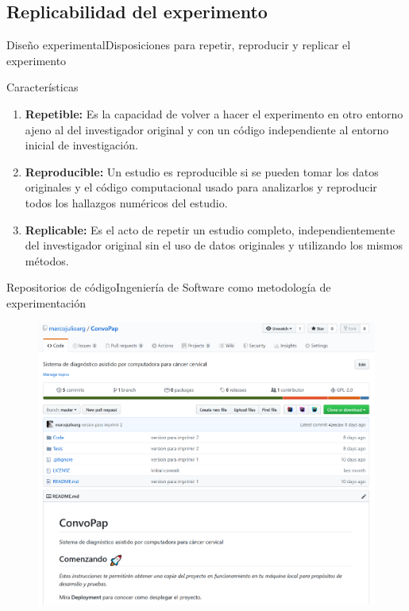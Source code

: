 \documentclass{beamer}
\begin{document}
    \subsection{Replicabilidad del experimento}
    \begin{frame}{Diseño experimental}{Disposiciones para repetir, reproducir y replicar el experimento}
        \begin{block}{Características}{
            \begin{enumerate}
                \item{\textbf{Repetible:}} Es la capacidad de volver a hacer el experimento
                en otro entorno ajeno al del investigador original y con un código
                independiente al entorno inicial de investigación.
                \item{\textbf{Reproducible:}} Un estudio es reproducible si se pueden tomar
                los datos originales y el código computacional usado para analizarlos y
                reproducir todos los hallazgos numéricos del estudio.
                \item{\textbf{Replicable:}} Es el acto de repetir un estudio completo,
                independientemente del investigador original sin el uso de datos originales
                y utilizando los mismos métodos.
            \end{enumerate}
        }
        \end{block}
    \end{frame}

    \begin{frame}{Repositorios de código}{Ingeniería de Software como metodología de experimentación}
        \begin{figure}[]
            \centering
            \includegraphics[height=0.95\textheight]{git}
        \end{figure}
    \end{frame}
\end{document}
